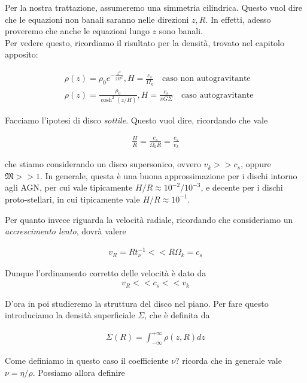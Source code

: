 \documentclass{report}
\begin{document}
Per la nostra trattazione, assumeremo una simmetria cilindrica. Questo vuol dire che le equazioni non banali saranno nelle direzioni \(z, R\). In effetti, adesso proveremo che anche le equazioni lungo \(z\) sono banali. \\

Per vedere questo, ricordiamo il risultato per la densità, trovato nel capitolo apposito: 

\begin{align}
    &\rho(z) = \rho_0 e^{-\frac{z^2}{2H^2}}, H = \frac{c_s}{\Omega_k} \quad \text{caso non autogravitante} \\
    &\rho(z) = \frac{\rho_0}{\cosh^2 (z/H)}, H =\frac{c_s}{\pi G \Sigma} \quad \text{caso autogravitante}
\end{align}

Facciamo l'ipotesi di disco \emph{sottile}. Questo vuol dire, ricordando che vale 

\begin{align}
    \frac{H}{R} = \frac{c_s}{\Omega_k R} = \frac{c_s}{v_k}
\end{align}

che stiamo considerando un disco supersonico, ovvero \(v_k >> c_s\), oppure  \(\mathfrak{M} >>1\). In generale, questa è una buona approssimazione per i dischi intorno agli AGN, per cui vale tipicamente \(H/R \approx 10^{-2}/10^{-3}\), e decente per i dischi proto-stellari, in cui tipicamente vale \(H/R \approx 10^{-1}\). 

Per quanto invece riguarda la velocità radiale, ricordando che consideriamo un \emph{accrescimento lento}, dovrà valere

\begin{align}
    v_R = Rt_{\nu}^{-1} << R \Omega_k = c_s
\end{align}

Dunque l'ordinamento corretto delle velocità è dato da 
\begin{align}
    v_R << c_s << v_k
\end{align}

D'ora in poi studieremo la struttura del disco nel piano. Per fare questo introduciamo la densità superficiale \(\Sigma\), che è definita da 

\begin{align}
    \Sigma(R) = \int_{-\infty}^{+\infty}\rho(z, R)dz 
\end{align}

Come definiamo in questo caso il coefficiente \(\nu\)? ricorda che in generale vale \(\nu = \eta/\rho\). Possiamo allora definire
\end{document}
